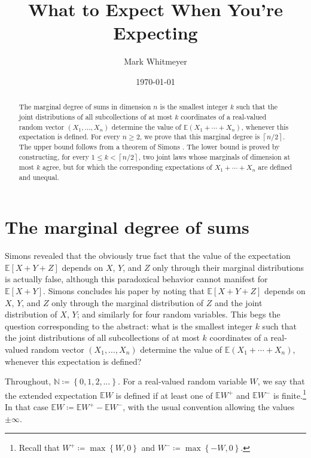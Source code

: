 \documentclass[11pt]{amsart}
\title[What to Expect When You're Expecting]{What to Expect When You're Expecting}
\author{Mark Whitmeyer}
\date{\today}
\theoremstyle{plain}
\theoremstyle{definition}
\theoremstyle{remark}
\numberwithin{equation}{section}
\newcommand{\N}{\mathbb N}
\newcommand{\E}{\mathbb E}
\newcommand{\1}{\mathbf 1}
\begin{document}
\begin{abstract}
The marginal degree of sums in dimension \(n\) is the smallest integer \(k\) such that the joint distributions of all subcollections of at most \(k\) coordinates of a real-valued random vector \(\left(X_1,\ldots,X_n\right)\) determine the value of
\(\E\left(X_1+\cdots+X_n\right)\), whenever this expectation is defined. For every \(n\ge2\), we prove that this marginal degree is
\(\left\lceil n/2\right\rceil\). The upper bound follows from a theorem of Simons \cite{Simons1977Unexpected}. The lower bound is proved by constructing, for every
\(1\le k<\left\lceil n/2\right\rceil\), two joint laws whose marginals of dimension at most \(k\) agree, but for which the corresponding expectations of \(X_1+\cdots+X_n\) are defined and unequal.
\end{abstract}

\maketitle

\section{The marginal degree of sums}
Simons \cite{Simons1977Unexpected} revealed that the obviously true fact that the value of the expectation \(\E\left[X+Y+Z\right]\) depends on \(X\), \(Y\), and \(Z\) only through their marginal distributions is actually false, although this paradoxical behavior cannot manifest for \(\E\left[X+Y\right]\). Simons concludes his paper by noting that \(\E\left[X+Y+Z\right]\) depends on \(X\), \(Y\), and \(Z\) only through the marginal distribution of \(Z\) and the joint  distribution of \(X\), \(Y\); and similarly for four random variables. This begs the question corresponding to the abstract: what is the smallest integer \(k\) such that the joint distributions of all subcollections of at most \(k\) coordinates of a real-valued random vector \(\left(X_1,\ldots,X_n\right)\) determine the value of
\(\E\left(X_1+\cdots+X_n\right)\), whenever this expectation is defined?

Throughout, \(\N\coloneqq\left\{0,1,2,\ldots\right\}\). For a real-valued random variable \(W\), we say that the extended expectation \(\E W\) is defined if at least one of \(\E W^+\) and \(\E W^-\) is finite.\footnote{Recall that \(W^+\coloneqq\max\left\{W,0\right\}\) and \(W^-\coloneqq\max\left\{-W,0\right\}\).} In that case \(\E W\coloneqq\E W^+-\E W^-\), with the usual convention allowing the values \(\pm\infty\).
\end{document}
